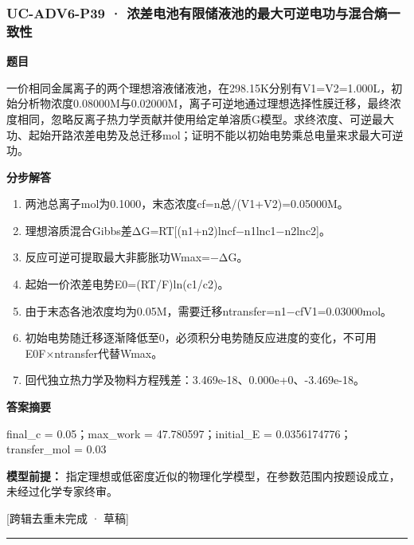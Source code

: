 \documentclass[UTF8,11pt,a4paper]{ctexart}
\begin{document}
\subsubsection*{UC-ADV6-P39 · 浓差电池有限储液池的最大可逆电功与混合熵一致性}
\noindent\textbf{题目}\par
一价相同金属离子的两个理想溶液储液池，在298.15K分别有V1=V2=1.000L，初始分析物浓度0.08000M与0.02000M，离子可逆地通过理想选择性膜迁移，最终浓度相同，忽略反离子热力学贡献并使用给定单溶质G模型。求终浓度、可逆最大功、起始开路浓差电势及总迁移mol；证明不能以初始电势乘总电量来求最大可逆功。\par
\medskip\noindent\textbf{分步解答}
\begin{enumerate}
\item 两池总离子mol为0.1000，末态浓度cf=n总/(V1+V2)=0.05000M。
\item 理想溶质混合Gibbs差ΔG=RT[(n1+n2)lncf−n1lnc1−n2lnc2]。
\item 反应可逆可提取最大非膨胀功Wmax=−ΔG。
\item 起始一价浓差电势E0=(RT/F)ln(c1/c2)。
\item 由于末态各池浓度均为0.05M，需要迁移ntransfer=n1−cfV1=0.03000mol。
\item 初始电势随迁移逐渐降低至0，必须积分电势随反应进度的变化，不可用E0F×ntransfer代替Wmax。
\item 回代独立热力学及物料方程残差：3.469e-18、0.000e+0、-3.469e-18。
\end{enumerate}
\noindent\textbf{答案摘要}\par
final\_c = 0.05；max\_work = 47.780597；initial\_E = 0.0356174776；transfer\_mol = 0.03\par
\noindent\textbf{模型前提：}
指定理想或低密度近似的物理化学模型，在参数范围内按题设成立，未经过化学专家终审。\par
\noindent\textcolor{red!65!black}{[跨辑去重未完成 · 草稿]} \par
\medskip\hrule\medskip
{}
\end{document}
